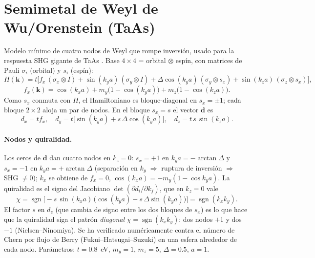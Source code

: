 \documentclass[11pt,a4paper]{article}
\newcommand{\kk}{\bm{k}}
\begin{document}
\section{Semimetal de Weyl de Wu/Orenstein (TaAs)}
Modelo m\'inimo de cuatro nodos de Weyl que rompe inversi\'on, usado para
la respuesta SHG gigante de TaAs \cite{Wu2017}. Base $4\times4$ =
orbital $\otimes$ esp\'in, con matrices de Pauli $\sigma_i$ (orbital) y
$s_i$ (esp\'in):
\begin{equation}
  H(\kk) = t\Big[ f_x\,(\sigma_x\!\otimes\! I)
    + \sin(k_y a)\,(\sigma_y\!\otimes\! I)
    + \Delta\cos(k_y a)\,(\sigma_y\!\otimes\! s_x)
    + \sin(k_z a)\,(\sigma_z\!\otimes\! s_x)\Big],
\end{equation}
\begin{equation}
  f_x(\kk) = \cos(k_x a) + m_y\big(1-\cos(k_y a)\big) + m_z\big(1-\cos(k_z a)\big).
\end{equation}
Como $s_x$ conmuta con $H$, el Hamiltoniano es bloque-diagonal en
$s_x=\pm1$; cada bloque $2\times2$ aloja un par de nodos. En el bloque
$s_x=s$ el vector $\bm{d}$ es
\begin{equation}
  d_x = t f_x,\quad
  d_y = t\big[\sin(k_y a) + s\,\Delta\cos(k_y a)\big],\quad
  d_z = t\, s\,\sin(k_z a).
\end{equation}
\paragraph{Nodos y quiralidad.} Los ceros de $\bm{d}$ dan cuatro nodos en
$k_z=0$: $s_x=+1$ en $k_y a=-\arctan\Delta$ y $s_x=-1$ en
$k_y a=+\arctan\Delta$ (separaci\'on en $k_y$ $\Rightarrow$ ruptura de
inversi\'on $\Rightarrow$ SHG $\neq0$); $k_x$ se obtiene de $f_x=0$,
$\cos(k_x a)=-m_y(1-\cos k_y a)$. La quiralidad es el signo del
Jacobiano $\det(\partial d_i/\partial k_j)$, que en $k_z=0$ vale
\begin{equation}
  \chi = \operatorname{sgn}\!\Big[-s\,\sin(k_x a)\,
        \big(\cos(k_y a) - s\,\Delta\sin(k_y a)\big)\Big]
      = \operatorname{sgn}(k_x k_y).
\end{equation}
El factor $s$ en $d_z$ (que cambia de signo entre los dos bloques de
$s_x$) es lo que hace que la quiralidad siga el patr\'on \emph{diagonal}
$\chi=\operatorname{sgn}(k_x k_y)$: dos nodos $+1$ y dos $-1$
(Nielsen--Ninomiya). Se ha verificado num\'ericamente contra el n\'umero
de Chern por flujo de Berry (Fukui--Hatsugai--Suzuki) en una esfera
alrededor de cada nodo. Par\'ametros: $t=0.8$~eV, $m_y=1$, $m_z=5$,
$\Delta=0.5$, $a=1$.
\end{document}
